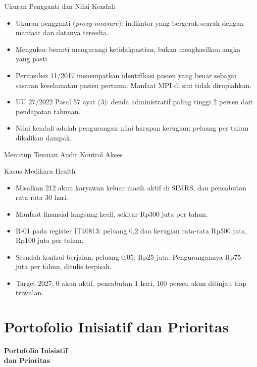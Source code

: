 \documentclass[aspectratio=169, table, 12pt]{beamer}
\begin{document}
\begin{frame}{{\Large Ukuran Pengganti dan Nilai Kendali}}
  \small
  \vspace{4pt}
  \begin{itemize}
    \item Ukuran pengganti (\textit{proxy measure}): indikator yang bergerak searah dengan manfaat dan
          datanya tersedia.
    \item Mengukur berarti mengurangi ketidakpastian, bukan menghasilkan angka yang pasti.
    \item Permenkes 11/2017 menempatkan identifikasi pasien yang benar sebagai sasaran keselamatan
          pasien pertama. Manfaat MPI di sini tidak dirupiahkan.
    \item UU 27/2022 Pasal 57 ayat (3): denda administratif paling tinggi 2 persen dari pendapatan
          tahunan.
    \item Nilai kendali adalah pengurangan nilai harapan kerugian: peluang per tahun dikalikan dampak.
  \end{itemize}
\end{frame}

\begin{frame}{{\Large Menutup Temuan Audit Kontrol Akses}}
  \begin{block}{Kasus Medikara Health}
    \small
    \begin{itemize}
      \item Misalkan 212 akun karyawan keluar masih aktif di SIMRS, dan pencabutan rata-rata 30 hari.
      \item Manfaat finansial langsung kecil, sekitar Rp300 juta per tahun.
      \item R-01 pada register IT40813: peluang 0,2 dan kerugian rata-rata Rp500 juta, Rp100 juta per tahun.
      \item Sesudah kontrol berjalan, peluang 0,05: Rp25 juta. Pengurangannya Rp75 juta per tahun,
            ditulis terpisah.
      \item Target 2027: 0 akun aktif, pencabutan 1 hari, 100 persen akun ditinjau tiap triwulan.
    \end{itemize}
  \end{block}
\end{frame}

\section{Portofolio Inisiatif dan Prioritas}

\begin{frame}{\hfill}
  \centering
  \Huge{\textbf{Portofolio Inisiatif\\dan Prioritas}}
\end{frame}
\end{document}

